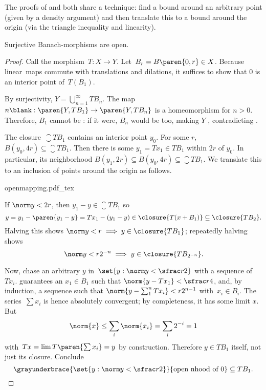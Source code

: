 \documentclass{scrartcl}
\newcommand{\ball}{B}
\begin{document}
The proofs of  and  both share a technique: find a bound around an arbitrary point (given by a density argument) and then translate this to a bound around the origin (via the triangle inequality and linearity).
\begin{theorem}\label{open mapping theorem}
  Surjective Banach-morphisms are open. \cite[pg.\ 162]{folland}
\end{theorem}
\begin{proof}
  Call the morphism~\(T:X\to Y\). Let~\(\ball_r=\ball\paren{0,r}\in X\). Because linear~maps commute with translations and dilations, it suffices to show that \(0\) is an interior point of~\(T(B_1)\).

  By surjectivity,
  \(Y = \bigcup_{n=1}^\infty TB_n\). The map \(n\blank: \paren{Y,TB_1}\to \paren{Y,TB_n}\) is a homeomorphism for \(n>0\). Therefore, \(B_1\) cannot be : if it were, \(\ball_n\) would be too, making \(Y\) , contradicting .

  The closure~\(\closure{T\ball_1}\) contains an interior point \(y_0\). For some \(r\), \(\ball(y_0,4r)\subseteq \closure{T\ball_1}\). Then there is some \(y_1=Tx_1\in T\ball_1\) within \(2r\) of \(y_0\). In particular, its neighborhood \(\ball(y_1,2r)\subseteq \ball(y_0,4r)\subseteq \closure{T\ball_1}\). We translate this to an inclusion of points around the origin as follows.
  \begin{center}
    {openmapping.pdf_tex}
  \end{center}
  If \(\norm y < 2r\), then \(y_1-y\in \closure{T\ball_1}\) so \[y=y_1-\paren{y_1-y} = Tx_1 - (y_1-y)\in \closure{T(x+\ball_1)}\subseteq \closure{T\ball_2}.\] Halving this shows \(\norm y < r \implies y\in \closure{T\ball_1}\); repeatedly halving shows
  \begin{equation}
    \norm y < r2^{-n} \implies y\in \closure{T\ball_{2^{-n}}}.\label{eq:openmap-small enough to be in closed image}
  \end{equation}

Now, chase an arbitrary \(y\) in~\(\set{y:\norm y < \sfrac r 2}\) with a sequence of~\(Tx_i\).  guarantees an \(x_1\in \ball_1\) such that \(\norm{y-Tx_1} < \sfrac r 4\), and, by induction, a sequence such that \(\norm{y-\sum_1^n Tx_i} < r2^{n-1}\) with~\(x_i\in\ball_i\). The series~\(\sum x_i\) is hence absolutely convergent; by completeness, it has some limit \(x\). But
\[
  \norm{x} \leq \sum_i \norm{x_i} = \sum_i 2^{-i} = 1
\]
with~\(Tx=\lim T\paren{\sum x_i}=y\) by construction. Therefore \(y\in T\ball_1\) itself, not just its closure. Conclude
\[
  \grayunderbrace{\set{y: \norm y < \sfrac r 2}}{\text{open nhood of } 0} \subseteq T\ball_1.
\]
\end{proof}
\end{document}
